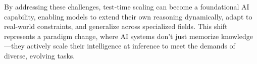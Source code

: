 By addressing these challenges, test-time scaling can become a foundational AI capability, enabling models to extend their own reasoning dynamically, adapt to real-world constraints, and generalize across specialized fields. This shift represents a paradigm change, where AI systems don’t just memorize knowledge—they actively scale their intelligence at inference to meet the demands of diverse, evolving tasks.




